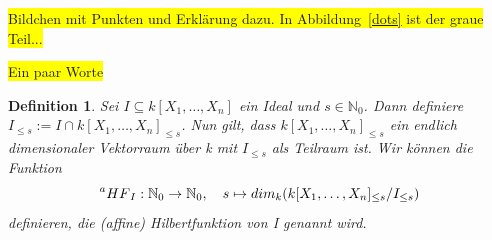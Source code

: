 \documentclass{article}
\newtheorem{definition}[satz]{Definition}
\newcommand*{\R}{k[X_{1},\ldots,X_{n}]}
\begin{document}
	\colorbox{yellow}{Bildchen mit Punkten und Erklärung dazu.
	In Abbildung~\ref{dots} ist der graue Teil...}

	
	\colorbox{yellow}{Ein paar Worte}


	\begin{definition} \label{1.2.11}
	Sei \(I \subseteq \R\) ein Ideal und \(s \in \mathbb{N}_{0}\). Dann definiere \(I_{\leq s} :=
	I \cap \R_{\leq s}\). Nun gilt, dass \(\R_{\leq s}\) ein endlich dimensionaler Vektorraum über
	k  mit \(I_{\leq s}\) als Teilraum ist. Wir können die Funktion \begin{displaymath}
	\prescript{a}{}{HF}_{I} : \mathbb{N}_{0} \rightarrow \mathbb{N}_{0}, \quad s \mapsto
	dim_{k}(\R_{\leq s}/I_{\leq s})	\end{displaymath} definieren, die (affine) Hilbertfunktion
	von I genannt wird.
	\end{definition}
\end{document}
